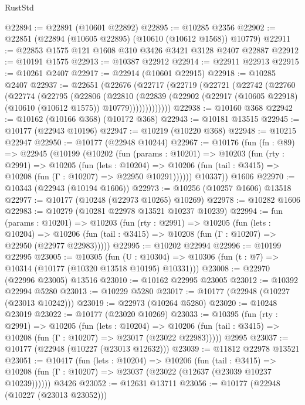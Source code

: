 \begin{lexlean}{RustStd}
\begin{coremodule}
@22894 := @22891 (@10601 @22892)
@22895 := @10285 @2356
@22902 := @22851 (@22894 (@10605 @22895) (@10610 (@10612 @1568)) @10779)
@22911 := @22853 @1575 @121 @1608 @310 @3426 @3421 @3128 @2407 @22887
@22912 := @10191 @1575
@22913 := @10387 @22912
@22914 := @22911 @22913
@22915 := @10261 @2407
@22917 := @22914 (@10601 @22915)
@22918 := @10285 @2407
@22937 := @22651
    (@22676
      (@22717
        (@22719
          (@22721
            (@22742
              (@22760
                (@22774
                  (@22795
                    (@22806
                      (@22810
                        (@22839
                          (@22902
                            (@22917 (@10605 @22918) (@10610 (@10612 @1575)) @10779)))))))))))))
@22938 := @10160 @368
@22942 := @10162 (@10166 @368) (@10172 @368)
@22943 := @10181 @13515
@22945 := @10177 (@22943 @10196)
@22947 := @10219 (@10220 @368)
@22948 := @10215 @22947
@22950 := @10177 (@22948 @10244)
@22967 := @10176
    (fun (fn : @89) =>
    @22945
      (@10199
        (@10202
          (fun (params : @10201) =>
          @10203
            (fun (rty : @2991) =>
            @10205
              (fun (lets : @10204) =>
              @10206 (fun (tail : @3415) => @10208 (fun (Γ : @10207) => @22950 @10291))))))
        @10337))
    @1606
@22970 := @10343 (@22943 (@10194 @1606))
@22973 := @10256 (@10257 @1606) @13518
@22977 := @10177 (@10248 (@22973 @10265) @10269)
@22978 := @10282 @1606
@22983 := @10279 (@10281 @22978 @13521 @10237 @10239)
@22994 := fun (params : @10201) =>
  @10203
    (fun (rty : @2991) =>
    @10205
      (fun (lets : @10204) =>
      @10206 (fun (tail : @3415) => @10208 (fun (Γ : @10207) => @22950 (@22977 @22983)))))
@22995 := @10202 @22994
@22996 := @10199 @22995
@23005 := @10305
    (fun (U : @10304) => @10306 (fun (t : @7) => @10314 (@10177 (@10320 @13518 @10195) @10331)))
@23008 := @22970 (@22996 @23005) @13516
@23010 := @10162 @22995 @23005
@23012 := @10392 @22994 @5280
@23013 := @10229 @5280
@23017 := @10177 (@22948 (@10227 (@23013 @10242)))
@23019 := @22973 (@10264 @5280)
@23020 := @10248 @23019
@23022 := @10177 (@23020 @10269)
@23033 := @10395
    (fun (rty : @2991) =>
    @10205
      (fun (lets : @10204) =>
      @10206 (fun (tail : @3415) => @10208 (fun (Γ : @10207) => @23017 (@23022 @22983)))))
    @2995
@23037 := @10177 (@22948 (@10227 (@23013 @12632)))
@23039 := @11812 @22978 @13521
@23051 := @10417
    (fun (lets : @10204) =>
    @10206
      (fun (tail : @3415) =>
      @10208 (fun (Γ : @10207) => @23037 (@23022 (@12637 (@23039 @10237 @10239))))))
    @3426
@23052 := @12631 @13711
@23056 := @10177 (@22948 (@10227 (@23013 @23052)))

\end{coremodule}
\end{lexlean}
